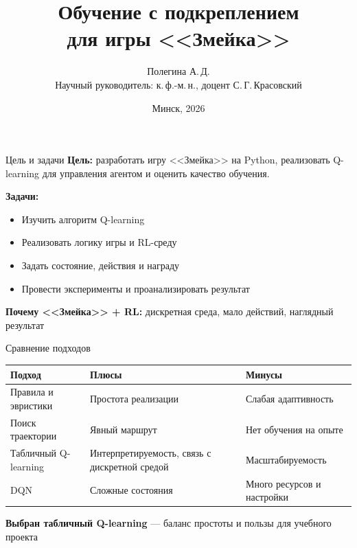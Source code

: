 \documentclass[aspectratio=169]{beamer}
\title{Обучение с подкреплением\\для игры <<Змейка>>}
\author{Полегина А.\,Д.\\Научный руководитель: к.\,ф.-м.\,н., доцент С.\,Г.\,Красовский}
\institute{БГУ, мехмат, каф. дифф.\ уравнений и системного анализа}
\date{Минск, 2026}
\begin{document}
\begin{frame}[plain]
\titlepage
\end{frame}

\begin{frame}{Цель и задачи}
\textbf{Цель:} разработать игру <<Змейка>> на Python, реализовать Q-learning для управления агентом и оценить качество обучения.

\vspace{0.5cm}
\textbf{Задачи:}
\begin{itemize}
    \item Изучить алгоритм Q-learning
    \item Реализовать логику игры и RL-среду
    \item Задать состояние, действия и награду
    \item Провести эксперименты и проанализировать результат
\end{itemize}

\vspace{0.4cm}
\textbf{Почему <<Змейка>> + RL:} дискретная среда, мало действий, наглядный результат
\end{frame}

\begin{frame}{Сравнение подходов}
\centering
\begin{tabularx}{0.92\textwidth}{>{\raggedright\arraybackslash}p{} >{\raggedright\arraybackslash}p{} X}
    \toprule
    Подход & Плюсы & Минусы \\
    \midrule
    Правила и эвристики & Простота реализации & Слабая адаптивность \\
    Поиск траектории & Явный маршрут & Нет обучения на опыте \\
    \rowcolor{blue!15} Табличный Q-learning & Интерпретируемость, связь с дискретной средой & Масштабируемость \\
    DQN & Сложные состояния & Много ресурсов и настройки \\
    \bottomrule
\end{tabularx}

\vspace{0.5cm}
\textbf{Выбран табличный Q-learning} --- баланс простоты и пользы для учебного проекта
\end{frame}
\end{document}
